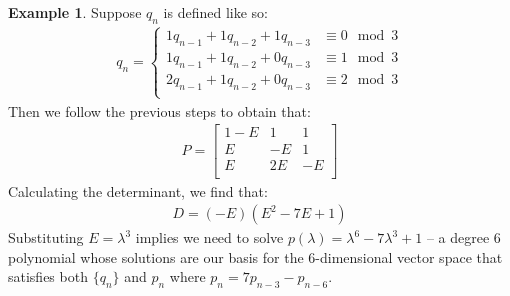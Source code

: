 \documentclass[a4paper]{article}
\theoremstyle{definition}
\newtheorem{example}{Example}[section]
\begin{document}
\begin{example}

Suppose $q_n$ is defined like so:
\begin{align*}
q_n=
\begin{cases}
1q_{n-1}+1q_{n-2}+1q_{n-3} & \equiv 0 \mod 3 \\
1q_{n-1}+1q_{n-2}+0q_{n-3} & \equiv 1 \mod 3 \\
2q_{n-1}+1q_{n-2}+0q_{n-3} & \equiv 2 \mod 3 \\
\end{cases}
\end{align*}
Then we follow the previous steps to obtain that:
\begin{align*}
P=
\begin{bmatrix}
    1-E & 1  & 1  \\
    E   & -E & 1  \\
    E   & 2E & -E \\
\end{bmatrix}
\end{align*}
Calculating the determinant, we find that:
\begin{align*}
D=(-E)(E^2-7E+1)
\end{align*}
Substituting $E=\lambda^3$ implies we need to solve $p(\lambda)=\lambda^6-7\lambda^3+1$ -- a degree 6
polynomial whose solutions are our basis for the 6-dimensional vector space that satisfies both
$\{q_n\}$ and ${p_n}$ where $p_n=7p_{n-3}-p_{n-6}$.
\end{example}
\end{document}
